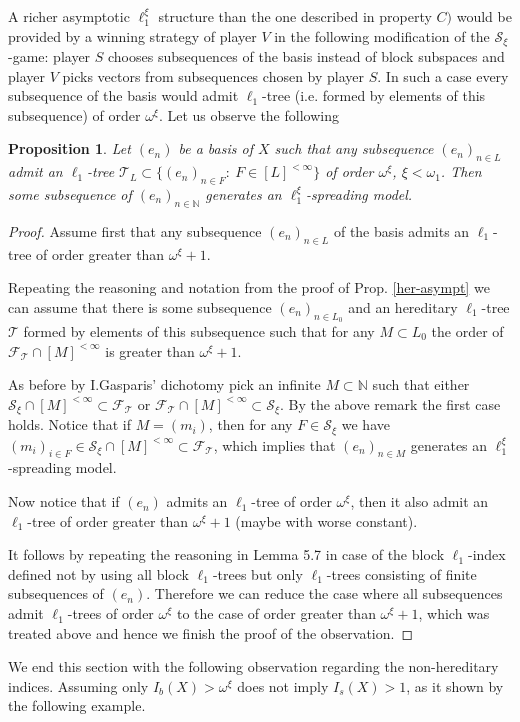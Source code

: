 \documentclass[a4paper]{amsart}
\theoremstyle{plain}
\newtheorem{proposition}[theorem]{Proposition}
\newcommand{\N}{\mathbb{N}}
\newcommand{\mc}{\mathcal}
\begin{document}
A richer asymptotic $\ell_{1}^{\xi}$ structure than the one described in property $C)$
would be provided by a winning strategy of player $V$ in the following modification of
the $\mc{S}_\xi$-game: player $S$ chooses subsequences of the basis instead of block
subspaces and player $V$ picks vectors from subsequences chosen by player $S$. In such
a case every subsequence of the basis would admit $\ell_{1}$-tree (i.e. formed by elements
of this subsequence) of order $\omega^{\xi}$. Let us observe the following
\begin{proposition}\label{p2.7} Let $(e_n)$ be a basis of $X$ such that any subsequence $(e_n)_{n\in
L}$ admit an $\ell_{1}$-tree $\mc{T}_L\subset\{(e_n)_{n\in F}:\ F\in [L]^{<\infty}\}$ of order
$\omega^\xi$, $\xi<\omega_1$. Then some subsequence of $(e_n)_{n\in\N}$ generates an
$\ell_{1}^{\xi}$-spreading model.
\end{proposition}
\begin{proof}
Assume first that any subsequence $(e_n)_{n\in L}$ of the basis admits an $\ell_{1}$-tree
of order greater than $\omega^\xi+1$.

Repeating the reasoning and notation from the proof of Prop. \ref{her-asympt} we can
assume that there is some subsequence $(e_n)_{n\in L_0}$ and an hereditary $\ell_{1}$-tree
$\mc{T}$ formed by elements of this subsequence such that for any $M\subset L_0$ the
order of $\mc{F}_\mc{T}\cap [M]^{<\infty}$ is greater than $\omega^\xi+1$.

As before by I.Gasparis' dichotomy \cite{GA} pick an infinite $M\subset\N$ such that
either $\mc{S}_\xi\cap [M]^{<\infty}\subset \mc{F}_\mc{T}$ or $\mc{F}_\mc{T}\cap
[M]^{<\infty}\subset \mc{S}_\xi$. By the above remark the first case holds. Notice that
if $M=(m_i)$, then for any $F\in \mc{S}_\xi$ we have $(m_i)_{i\in F}\in \mc{S}_\xi\cap
[M]^{<\infty}\subset \mc{F}_\mc{T}$, which implies that $(e_n)_{n\in M}$ generates an
$\ell_{1}^\xi$-spreading model.

Now notice that if $(e_n)$ admits an $\ell_{1}$-tree of order $\omega^\xi$, then it also
admit an $\ell_{1}$-tree of order greater than $\omega^\xi+1$ (maybe with worse constant).

It follows by repeating the reasoning in Lemma 5.7 \cite{JO} in case of the block
$\ell_{1}$-index defined not by using all block $\ell_{1}$-trees but only
$\ell_{1}$-trees consisting of finite subsequences of $(e_n)$. Therefore we can reduce the
case where all subsequences admit $\ell_{1}$-trees of order $\omega^\xi$ to the case of
order greater than $\omega^\xi+1$, which was treated above and hence we finish the proof
of the observation.
\end{proof}
We end this section with the following observation regarding the non-hereditary indices.
Assuming only $I_b(X)>\omega^\xi$ does not imply $I_s(X)> 1$, as it shown by the following example.
\end{document}
